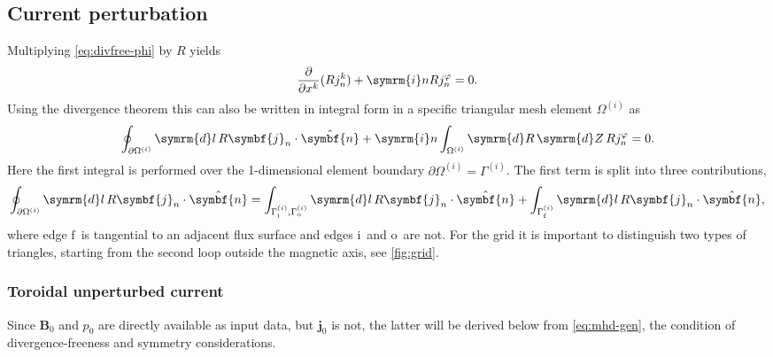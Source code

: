 \documentclass[a4paper, 10pt, english]{article}
\let\temp\vartheta
\let\vartheta\theta
\let\theta\temp
\let\temp\varphi
\let\varphi\phi
\let\phi\temp
\let\vec\symbf
\newcommand*\diff{\ensuremath{\symrm{d}}}  %
\newcommand*\im{\ensuremath{\symrm{i}}}  %
\newcommand*\pd[2][]{\ensuremath{\frac{\partial #1}{\partial #2}}}  %
\newcommand*\fs{\ensuremath{\textrm{f}}}  %
\newcommand*\inw{\ensuremath{\textrm{i}}}  %
\newcommand*\out{\ensuremath{\textrm{o}}}  %
\begin{document}
\subsection{Current perturbation}

Multiplying \cref{eq:divfree-phi} by $R$ yields
\begin{gather}
  \pd{x^{k}} (R j_{n}^{k}) + \im n R j_{n}^{\phi} = 0.
\end{gather}
Using the divergence theorem this can also be written in integral form in a specific triangular mesh element $\Omega^{(i)}$ as
\begin{gather}
  \oint_{\partial \Omega^{(i)}} \diff l \, R \vec{j}_{n} \cdot \hat{\vec{n}} + \im n \int_{\Omega^{(i)}} \diff R \, \diff Z \, R j_{n}^{\phi} = 0.
\end{gather}
Here the first integral is performed over the 1-dimensional element boundary $\partial \Omega^{(i)} = \Gamma^{(i)}$. The first term is split into three contributions,
\begin{gather}
  \oint_{\partial \Omega^{(i)}} \diff l \, R \vec{j}_{n} \cdot \hat{\vec{n}} = \int_{\Gamma_{\inw}^{(i)}, \Gamma_{\out}^{(i)}} \diff l \, R \vec{j}_{n} \cdot \hat{\vec{n}} + \int_{\Gamma_{\fs}^{(i)}} \diff l \, R \vec{j}_{n} \cdot \hat{\vec{n}},
\end{gather}
where edge \fs\ is tangential to an adjacent flux surface and edges \inw\ and \out\ are not. For the grid it is important to distinguish two types of triangles, starting from the second loop outside the magnetic axis, see \cref{fig:grid}.

\subsubsection{Toroidal unperturbed current}

Since $\vec{B}_{0}$ and $p_{0}$ are directly available as input data, but $\vec{j}_{0}$ is not, the latter will be derived below from \cref{eq:mhd-gen}, the condition of divergence-freeness and symmetry considerations.
\end{document}
